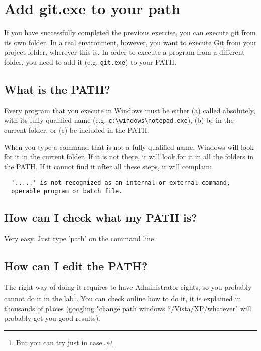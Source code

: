\documentclass{article}
\begin{document}
\vspace{1cm}

\section{Add git.exe to your path}
\label{sec:add-git.exe-your}

If you have successfully completed the previous exercise, you can
execute git from its own folder. In a real environment, however, you
want to execute Git from your project folder, wherever this is. In
order to execute a program from a different folder, you need to add it
(e.g. \verb+git.exe+) to your PATH. 

\subsection{What is the PATH?}
\label{sec:what-path}

Every program that you execute in Windows must be either (a) called
absolutely, with its fully qualified name
(e.g. \verb+c:\windows\notepad.exe+), (b) be in the current folder, 
or (c) be included in the PATH.

When you type a command that is not a fully qualified name, Windows
will look for it in the current folder. If it is not there, it will
look for it in all the folders in the PATH. If it cannot find it after
all these steps, it will complain:

\begin{verbatim}
  '.....' is not recognized as an internal or external command,
  operable program or batch file.
\end{verbatim}

\subsection{How can I check what my PATH is?}

Very easy. Just type 'path' on the command line.

\subsection{How can I edit the PATH?}

The right way of doing it requires to have Administrator rights, so
you probably cannot do it in the lab\footnote{But you can try just in
  case\ldots}.  
You can check online how to do it, it is
explained in thousands of places (googling "change path windows
7/Vista/XP/whatever" will probably get you good results).
\end{document}
